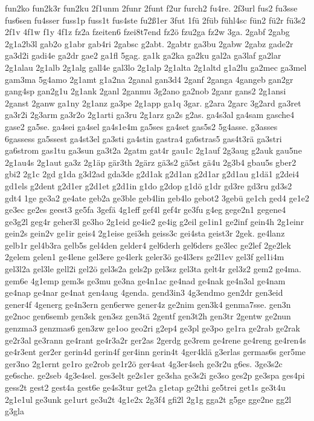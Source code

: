 {fun2ko
fun2k3r
fun2ku
2f1unm
2funr
2funt
f2ur
furch2
fu4re.
2f3url
fus2
fu3sse
fus6sen
fu4sser
fuss1p
fuss1t
fus4ste
fu2ß1er
3fut
1fü
2füb
fühl4sc
fün2
fü2r
fü3s2
2f1v
4f1w
f1y
4f1z
fz2a
fzeiten6
fzei8t7end
fz2ö
fzu2ga
fz2w
3ga.
2gabf
2gabg
2g1a2b3l
gab2o
g1abr
gab4ri
2gabsc
g2abt.
2gabtr
ga3bu
2gabw
2gabz
gade2r
ga3d2i
gadi4e
ga2dr
gae2
ga1fl
5gag.
ga1k
ga2ka
ga2ku
gal2a
ga3laf
ga2lar
2g1alau
2g1alb
2g1alg
gall4e
gal3lo
2g1alp
2g1alta
2g1altd
g1a2lu
ga2mec
ga3mel
gam3ma
5g4amo
2g1amt
g1a2na
2ganal
gan3d4
2ganf
2ganga
4gangeb
gan2gr
gang4sp
gan2g1u
2g1ank
2ganl
2ganmu
3g2ano
ga2nob
2ganr
gans2
2g1ansi
2ganst
2ganw
ga1ny
2g1anz
ga3pe
2g1app
ga1q
3gar.
g2ara
2garc
3g2ard
ga3ret
ga3r2i
2g3arm
ga3r2o
2g1arti
ga3ru
2g1arz
ga2s
g2as.
ga4s3al
ga4sam
gasche4
gase2
ga5se.
ga4sei
ga4sel
ga4s1e4m
ga5ses
ga4set
gas5s2
5g4asse.
g3asses
6gassess
ga5ssest
ga4st3el
ga3sti
ga4stin
gastra4
ga6stras5
gas4t3rä
ga3stri
ga6strom
gas1tu
ga3sun
ga3t2a
2gatm
gat4r
gau1c
2g1auf
2g3aug
g2auk
gau5ne
2g1au4s
2g1aut
ga3z
2g1äp
gär3th
2gärz
gä3s2
gä5st
gä4u
2g3b4
gbau5s
gber2
gbi2
2g1c
2gd
g1da
g3d2ad
gda3de
g2d1ak
g2d1an
g2d1ar
g2d1au
g1dä1
g2dei4
gd1els
g2dent
g2d1er
g2d1et
g2d1in
g1do
g2dop
g1dö
g1dr
gd3re
gd3ru
gd3s2
gdt4
1ge
ge3a2
ge4ate
geb2a
ge3ble
geb4lin
geb4lo
gebot2
3gebü
ge1ch
ged4
ge1e2
ge3ec
ge2es
geest3
ge5fa
3gefä
4g1eff
gef4l
gef4r
ge3fu
g4eg
gege2n1
gegene4
ge3g2l
geg4r
geher3l
ge3ho
2g1eid
ge4ie2
ge4ig
g2eil
ge1in1
ge2inf
gein4h
2g1einr
gein2s
gein2v
ge1ir
geis4
2g1eise
gei3sh
geiss3c
gei4sta
geist3r
2gek.
ge4lanz
gelb1r
gel4b3ra
gelb5s
gel4den
gelder4
gel6derh
gel6ders
ge3lec
ge2lef
2ge2lek
2gelem
gelen1
ge4lene
gel3ere
ge4lerk
geler3ö
ge4l3ers
ge2l1ev
gel3f
gel1i4m
gel3l2a
gel3le
gell2i
gel2ö
gel3s2a
gels2p
gel3sz
gel3ta
gelt4r
gel3z2
gem2
ge4ma.
gem6e
4g1emp
gem3s
ge3mu
ge3na
ge4n1ac
ge4nad
ge4nak
ge4n3al
ge4nam
ge4nap
ge4nar
ge4nat
gen4aug
4genda.
gend3in3
4g3endmo
gen2dr
gen3eid
gener4f
4generg
ge4n3ern
gen6erwe
gener4z
ge2nim
gen3k4
genma7sse.
gen3n
ge2noc
gen6semb
gen3sk
gen3sz
gen3tä
2gentf
gen3t2h
gen3tr
2gentw
ge2nun
genzma3
genzmas6
gen3zw
ge1oo
geo2ri
g2ep4
ge3pl
ge3po
ge1ra
ge2rab
ge2rak
ge2r3al
ge3rann
ge4rant
ge4r3a2r
ger2as
2gerdg
ge3rem
ge4rene
ge4reng
ge4ren4s
ge4r3ent
ger2er
gerin4d
gerin4f
ger4inn
gerin4t
4ger4klä
g3erlas
germas6s
ger5me
ger3no
2g1ernt
ge1ro
ge2rob
ge1r2ö
ger4sat
4g3er4seh
ge3r2u
g6es.
3ge3s2c
ge6sche.
ge2seb
4g3e4sel.
ges3elt
ge2s1er
ge3sha
ge3s2i
ge3so
ges2p
ge3spa
ges4pi
gess2t
gest2
gest4a
gest6e
ge4s3tur
get2a
g1etap
ge2thi
ge5trei
get1s
ge3t4u
2g1e1ul
ge3unk
ge1urt
ge3u2t
4g1e2x
2g3f4
gfi2l
2g1g
gga2t
g5ge
gge2ne
gg2l
g3gla
}

